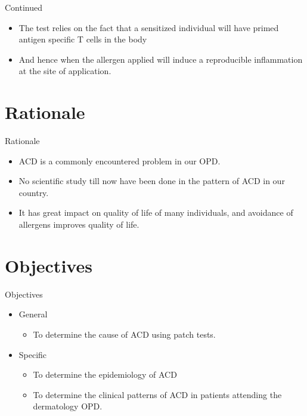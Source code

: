 \documentclass[11pt]{beamer}
\begin{document}
\begin{frame}{Continued}
\begin{itemize}
\item The test relies on the fact that a sensitized individual will have primed antigen specific T cells in the body 
\item And hence when the allergen applied will induce a reproducible inflammation at the site of application.

\end{itemize}
\end{frame}

\section{Rationale}

\begin{frame}{Rationale}
\begin{itemize}
\item ACD is a commonly encountered problem in our OPD.
\item No scientific study till now have been done in the pattern of ACD in our country.
\item It has great impact on quality of life of many individuals, and avoidance of allergens improves quality of life.

\end{itemize}

\end{frame}

\section{Objectives}

\begin{frame}{Objectives}
\begin{itemize}
\item General
\begin{itemize}
\item To determine the cause of ACD using patch tests.

\end{itemize}
\item Specific 
\begin{itemize}
\item To determine the epidemiology of ACD

\item To determine the clinical patterns of ACD in patients attending the dermatology OPD.

\end{itemize}
\end{itemize}

\end{frame}
\end{document}
